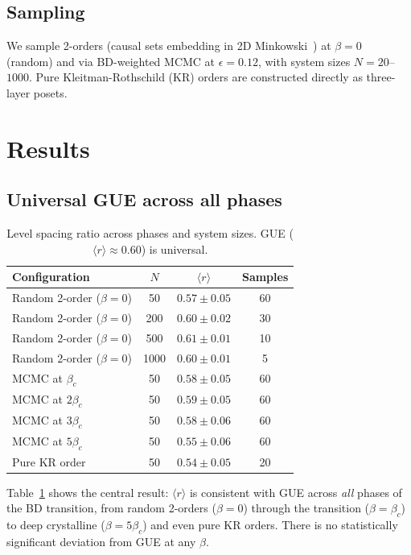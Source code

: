 \documentclass[aps,prd,twocolumn,superscriptaddress,nofootinbib]{revtex4-2}
\begin{document}
\subsection{Sampling}

We sample 2-orders (causal sets embedding in 2D Minkowski~\cite{glaser2018}) at $\beta = 0$ (random) and via BD-weighted MCMC at $\epsilon = 0.12$, with system sizes $N = 20$--$1000$. Pure Kleitman-Rothschild (KR) orders are constructed directly as three-layer posets.

\section{Results}

\subsection{Universal GUE across all phases}

\begin{table}[h]
\centering
\begin{tabular}{lccc}
\toprule
Configuration & $N$ & $\langle r \rangle$ & Samples \\
\midrule
Random 2-order ($\beta = 0$) & 50 & $0.57 \pm 0.05$ & 60 \\
Random 2-order ($\beta = 0$) & 200 & $0.60 \pm 0.02$ & 30 \\
Random 2-order ($\beta = 0$) & 500 & $0.61 \pm 0.01$ & 10 \\
Random 2-order ($\beta = 0$) & 1000 & $0.60 \pm 0.01$ & 5 \\
MCMC at $\beta_c$ & 50 & $0.58 \pm 0.05$ & 60 \\
MCMC at $2\beta_c$ & 50 & $0.59 \pm 0.05$ & 60 \\
MCMC at $3\beta_c$ & 50 & $0.58 \pm 0.06$ & 60 \\
MCMC at $5\beta_c$ & 50 & $0.55 \pm 0.06$ & 60 \\
Pure KR order & 50 & $0.54 \pm 0.05$ & 20 \\
\bottomrule
\end{tabular}
\caption{Level spacing ratio across phases and system sizes. GUE ($\langle r \rangle \approx 0.60$) is universal.}
\label{tab:universal}
\end{table}

Table~\ref{tab:universal} shows the central result: $\langle r \rangle$ is consistent with GUE across \emph{all} phases of the BD transition, from random 2-orders ($\beta = 0$) through the transition ($\beta = \beta_c$) to deep crystalline ($\beta = 5\beta_c$) and even pure KR orders. There is no statistically significant deviation from GUE at any $\beta$.
\end{document}
